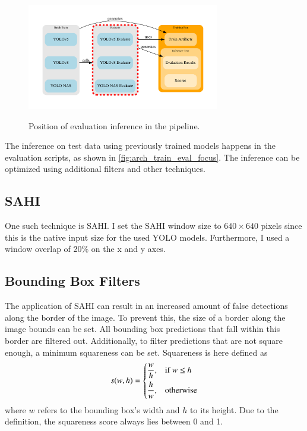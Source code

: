 \documentclass[10pt]{book}
\newcommand{\figureref}[1]{\autoref{#1}}
\begin{document}
\begin{figure}
  \caption{Position of evaluation inference in the pipeline.}
  \includegraphics[width=0.75\textwidth]{graph/arch_train_eval_focus}
  \label{fig:arch_train_eval_focus}
\end{figure}

The inference on test data using previously trained models happens in the evaluation scripts, as shown in \figureref{fig:arch_train_eval_focus}. The inference can be optimized using additional filters and other techniques. 

\subsection{SAHI}

One such technique is \ac{SAHI}. 
I set the \ac{SAHI} window size to $640 \times 640$ pixels since this is the native input size for the used \ac{YOLO} models. Furthermore, I used a window overlap of 20\% on the x and y axes.

\subsection{Bounding Box Filters}

The application of \ac{SAHI} can result in an increased amount of false detections along the border of the image. To prevent this, the size of a border along the image bounds can be set. All bounding box predictions that fall within this border are filtered out. Additionally, to filter predictions that are not square enough, %
a minimum squareness can be set. Squareness is here defined as $$ 
s(w,h)=
\begin{dcases}
    \frac{w}{h}, & \text{if } w\leq h\\
    \frac{h}{w}, & \text{otherwise}
\end{dcases} $$ where $w$ refers to the bounding box's width and $h$ to its height. Due to the definition, the squareness score always lies between 0 and 1.
\end{document}
